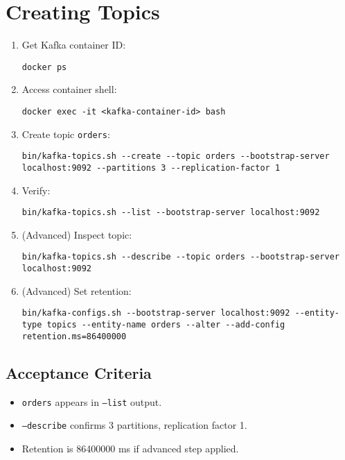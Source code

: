 \documentclass[12pt,a4paper]{report}
\begin{document}
\section{Creating Topics}
\begin{enumerate}
    \item Get Kafka container ID:
    \begin{lstlisting}
docker ps
    \end{lstlisting}
    \item Access container shell:
    \begin{lstlisting}
docker exec -it <kafka-container-id> bash
    \end{lstlisting}
    \item Create topic \texttt{orders}:
    \begin{lstlisting}
bin/kafka-topics.sh --create --topic orders --bootstrap-server localhost:9092 --partitions 3 --replication-factor 1
    \end{lstlisting}
    \item Verify:
    \begin{lstlisting}
bin/kafka-topics.sh --list --bootstrap-server localhost:9092
    \end{lstlisting}
    \item (Advanced) Inspect topic:
    \begin{lstlisting}
bin/kafka-topics.sh --describe --topic orders --bootstrap-server localhost:9092
    \end{lstlisting}
    \item (Advanced) Set retention:
    \begin{lstlisting}
bin/kafka-configs.sh --bootstrap-server localhost:9092 --entity-type topics --entity-name orders --alter --add-config retention.ms=86400000
    \end{lstlisting}
\end{enumerate}

\subsection{Acceptance Criteria}
\begin{itemize}
    \item \texttt{orders} appears in \texttt{--list} output.
    \item \texttt{--describe} confirms 3 partitions, replication factor 1.
    \item Retention is 86400000 ms if advanced step applied.
\end{itemize}
\end{document}
